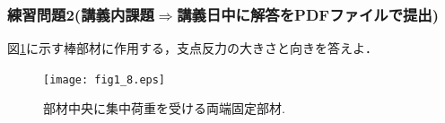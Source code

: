 \documentclass[10pt,a4j]{jarticle}
\begin{document}
\subsubsection{練習問題2{\small (講義内課題$\Rightarrow$講義日中に解答をPDFファイルで提出)}}
図\ref{fig:fig1_8}に示す棒部材に作用する，支点反力の大きさと向きを答えよ．
\begin{figure}[h]
	\begin{center}
	\texttt{[image: fig1\_8.eps]} 
	\end{center}
	\caption{部材中央に集中荷重を受ける両端固定部材.} 
	\label{fig:fig1_8}
\end{figure}
\end{document}
